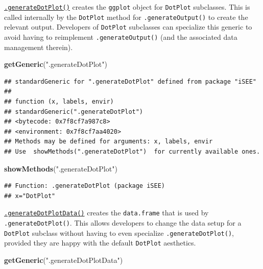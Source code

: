 \documentclass[
]{book}
\newenvironment{Shaded}{\begin{snugshade}}{\end{snugshade}}
\newcommand{\KeywordTok}[1]{\textcolor[rgb]{0.13,0.29,0.53}{\textbf{#1}}}
\newcommand{\NormalTok}[1]{#1}
\newcommand{\StringTok}[1]{\textcolor[rgb]{0.31,0.60,0.02}{#1}}
\begin{document}
\href{https://isee.github.io/iSEE/reference/plot-generics.html}{\texttt{.generateDotPlot()}} creates the \texttt{ggplot} object for \texttt{DotPlot} subclasses.
This is called internally by the \texttt{DotPlot} method for \texttt{.generateOutput()} to create the relevant output.
Developers of \texttt{DotPlot} subclasses can specialize this generic to avoid having to reimplement \texttt{.generateOutput()} (and the associated data management therein).

\begin{Shaded}
\begin{Highlighting}[]
\KeywordTok{getGeneric}\NormalTok{(}\StringTok{".generateDotPlot"}\NormalTok{)}
\end{Highlighting}
\end{Shaded}

\begin{verbatim}
## standardGeneric for ".generateDotPlot" defined from package "iSEE"
## 
## function (x, labels, envir) 
## standardGeneric(".generateDotPlot")
## <bytecode: 0x7f8cf7a987c8>
## <environment: 0x7f8cf7aa4020>
## Methods may be defined for arguments: x, labels, envir
## Use  showMethods(".generateDotPlot")  for currently available ones.
\end{verbatim}

\begin{Shaded}
\begin{Highlighting}[]
\KeywordTok{showMethods}\NormalTok{(}\StringTok{".generateDotPlot"}\NormalTok{)}
\end{Highlighting}
\end{Shaded}

\begin{verbatim}
## Function: .generateDotPlot (package iSEE)
## x="DotPlot"
\end{verbatim}

\href{https://isee.github.io/iSEE/reference/plot-generics.html}{\texttt{.generateDotPlotData()}} creates the \texttt{data.frame} that is used by \texttt{.generateDotPlot()}.
This allows developers to change the data setup for a \texttt{DotPlot} subclass without having to even specialize \texttt{.generateDotPlot()}, provided they are happy with the default \texttt{DotPlot} aesthetics.

\begin{Shaded}
\begin{Highlighting}[]
\KeywordTok{getGeneric}\NormalTok{(}\StringTok{".generateDotPlotData"}\NormalTok{)}
\end{Highlighting}
\end{Shaded}
\end{document}
